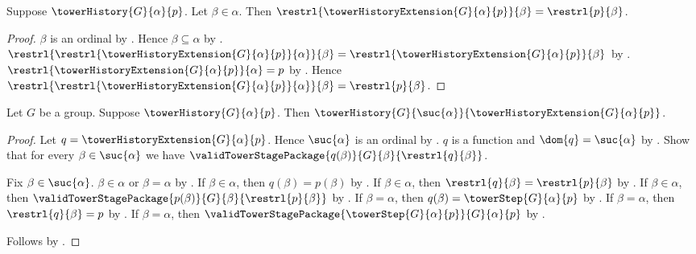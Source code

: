 \begin{proposition}\label{tower_history_extension_earlier_restriction}
    Suppose $\towerHistory{G}{\alpha}{p}$.
    Let $\beta\in\alpha$.
    Then $\restrl{\towerHistoryExtension{G}{\alpha}{p}}{\beta}=
        \restrl{p}{\beta}$.
\end{proposition}
\begin{proof}
    $\beta$ is an ordinal by
        .
    Hence $\beta\subseteq\alpha$ by
        .
    $\restrl{
            \restrl{\towerHistoryExtension{G}{\alpha}{p}}{\alpha}}
            {\beta}
        =\restrl{\towerHistoryExtension{G}{\alpha}{p}}{\beta}$ by
        .
    $\restrl{\towerHistoryExtension{G}{\alpha}{p}}{\alpha}=p$ by
        .
    Hence $\restrl{
            \restrl{\towerHistoryExtension{G}{\alpha}{p}}{\alpha}}
            {\beta}=\restrl{p}{\beta}$.
\end{proof}

\begin{theorem}\label{tower_history_extension_is_history}
    Let $G$ be a group.
    Suppose $\towerHistory{G}{\alpha}{p}$.
    Then $\towerHistory
        {G}{\suc{\alpha}}{\towerHistoryExtension{G}{\alpha}{p}}$.
\end{theorem}
\begin{proof}
    Let $q=\towerHistoryExtension{G}{\alpha}{p}$.
    Hence $\suc{\alpha}$ is an ordinal by .
    $q$ is a function and $\dom{q}=\suc{\alpha}$ by
        .
    Show that for every $\beta\in\suc{\alpha}$ we have
        $\validTowerStagePackage
            {q(\beta)}{G}{\beta}{\restrl{q}{\beta}}$.
    \begin{subproof}
        Fix $\beta\in\suc{\alpha}$.
        $\beta\in\alpha$ or $\beta=\alpha$ by .
        If $\beta\in\alpha$, then
            $q(\beta)=p(\beta)$ by
            .
        If $\beta\in\alpha$, then
            $\restrl{q}{\beta}=\restrl{p}{\beta}$ by
            .
        If $\beta\in\alpha$, then
            $\validTowerStagePackage
                {p(\beta)}{G}{\beta}{\restrl{p}{\beta}}$ by
            .
        If $\beta=\alpha$, then
            $q(\beta)=\towerStep{G}{\alpha}{p}$ by
            .
        If $\beta=\alpha$, then
            $\restrl{q}{\beta}=p$ by
            .
        If $\beta=\alpha$, then
            $\validTowerStagePackage
                {\towerStep{G}{\alpha}{p}}{G}{\alpha}{p}$ by
            .
    \end{subproof}
    Follows by .
\end{proof}

